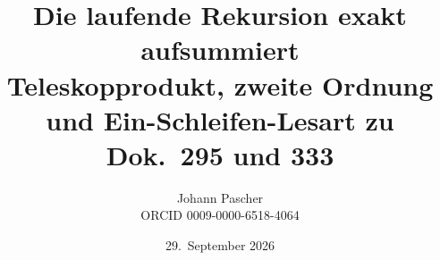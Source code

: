 \documentclass[11pt,a4paper]{report}
\title{Die laufende Rekursion exakt aufsummiert\\[0.5em]
  \large Teleskopprodukt, zweite Ordnung und Ein-Schleifen-Lesart zu Dok.~295 und 333}
\date{29.~September 2026}
\author{Johann Pascher\\\small ORCID 0009-0000-6518-4064}
\begin{document}
\renewcommand{\thechapter}{}
\renewcommand{\thesection}{\arabic{section}}
\maketitle
\tableofcontents

\end{document}
